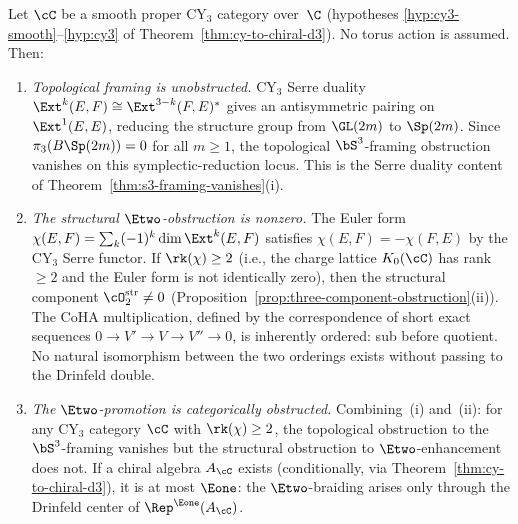 \begin{proposition}
\label{prop:e1-obstruction-categorical}
Let $\cC$ be a smooth proper CY$_3$ category over~$\C$ \textup{(}hypotheses \textup{\ref{hyp:cy3-smooth}--\ref{hyp:cy3}} of Theorem~\textup{\ref{thm:cy-to-chiral-d3}}\textup{)}. No torus action is assumed. Then:
\begin{enumerate}[label=\textup{(\roman*)}]
 \item \emph{Topological framing is unobstructed.}
 CY$_3$ Serre duality $\Ext^k(E, F) \cong \Ext^{3-k}(F, E)^*$ gives an antisymmetric pairing on $\Ext^1(E, E)$, reducing the structure group from $\GL(2m)$ to $\Sp(2m)$. Since $\pi_3(B\Sp(2m)) = 0$ for all $m \geq 1$, the topological $\bS^3$-framing obstruction vanishes on this symplectic-reduction locus. This is the Serre duality content of Theorem~\textup{\ref{thm:s3-framing-vanishes}(i)}.
 \item \emph{The structural $\Etwo$-obstruction is nonzero.}
 The Euler form $\chi(E, F) = \sum_k (-1)^k \dim \Ext^k(E, F)$ satisfies $\chi(E, F) = -\chi(F, E)$ by the CY$_3$ Serre functor. If $\rk(\chi) \geq 2$ \textup{(}i.e., the charge lattice $K_0(\cC)$ has rank $\geq 2$ and the Euler form is not identically zero\textup{)}, then the structural component $\cO_2^{\mathrm{str}} \neq 0$ \textup{(}Proposition~\textup{\ref{prop:three-component-obstruction}(ii)}\textup{)}. The CoHA multiplication, defined by the correspondence of short exact sequences $0 \to V' \to V \to V'' \to 0$, is inherently ordered: sub before quotient. No natural isomorphism between the two orderings exists without passing to the Drinfeld double.
 \item \emph{The $\Etwo$-promotion is categorically obstructed.}
 Combining~(i) and~(ii): for any CY$_3$ category $\cC$ with $\rk(\chi) \geq 2$, the topological obstruction to the $\bS^3$-framing vanishes but the structural obstruction to $\Etwo$-enhancement does not. If a chiral algebra $A_\cC$ exists \textup{(}conditionally, via Theorem~\textup{\ref{thm:cy-to-chiral-d3}}\textup{)}, it is at most $\Eone$: the $\Etwo$-braiding arises only through the Drinfeld center of $\Rep^{\Eone}(A_\cC)$.
\end{enumerate}
\end{proposition}


